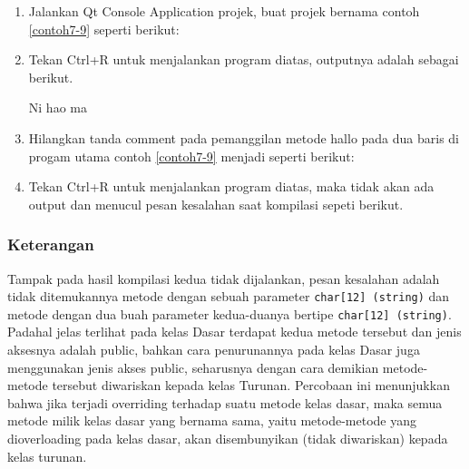 \begin{enumerate}

\item
  Jalankan Qt Console Application projek, buat projek bernama contoh 
  \ref{contoh7-9}  seperti berikut:



\item
  Tekan Ctrl+R untuk menjalankan program diatas, outputnya adalah
  sebagai berikut.


\begin{lcverbatim}
Ni hao ma
\end{lcverbatim}


\item
  Hilangkan tanda comment pada pemanggilan metode hallo pada dua baris
  di progam utama contoh \ref{contoh7-9} menjadi seperti berikut:



\item
  Tekan Ctrl+R untuk menjalankan program diatas, maka tidak akan ada
  output dan menucul pesan kesalahan saat kompilasi sepeti berikut.
\end{enumerate}

\begin{figure}[htbp]
\centering
{}

\end{figure}

\subsubsection*{Keterangan}

Tampak pada hasil kompilasi kedua tidak dijalankan, pesan kesalahan
adalah tidak ditemukannya metode dengan sebuah parameter
\texttt{char{[}12{]}\ (string)} dan metode dengan dua buah parameter
kedua-duanya bertipe \texttt{char{[}12{]}\ (string)}. Padahal jelas
terlihat pada kelas Dasar terdapat kedua metode tersebut dan jenis
aksesnya adalah public, bahkan cara penurunannya pada kelas Dasar juga
menggunakan jenis akses public, seharusnya dengan cara demikian
metode-metode tersebut diwariskan kepada kelas Turunan. Percobaan ini
menunjukkan bahwa jika terjadi overriding terhadap suatu metode kelas
dasar, maka semua metode milik kelas dasar yang bernama sama, yaitu
metode-metode yang dioverloading pada kelas dasar, akan disembunyikan
(tidak diwariskan) kepada kelas turunan.

